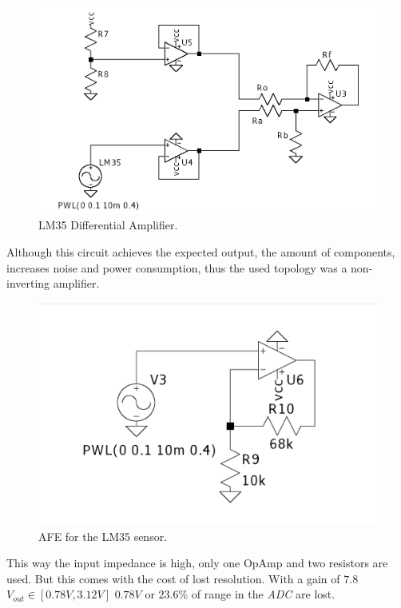\documentclass[12pt]{article}
\begin{document}
    \begin{figure}[H] 
        \centering
        \includegraphics*[scale = 0.3]{images/DiffAmpLM35.png}
        \caption{LM35 Differential Amplifier.}
        \label{wrap-fig:1}
    \end{figure}

    Although this circuit achieves the expected output, the amount of components,
    increases noise and power consumption, thus the used topology was a non-inverting amplifier.

    \begin{figure}[H] 
        \centering
        \includegraphics*[scale = 0.2]{images/AFELM35.png}
        \caption{AFE for the LM35 sensor.}
        \label{AFELM35}
    \end{figure}

    This way the input impedance is high, only one OpAmp and two resistors are used.
    But this comes with the cost of lost resolution. With a gain of $7.8$ $V_{out}\in[0.78V,3.12V]$
    $0.78V$ or $23.6\%$ of range in the \textit{ADC} are lost.
\end{document}
